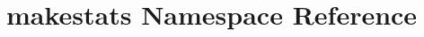 \hypertarget{namespacemakestats}{\section{makestats Namespace Reference}
\label{namespacemakestats}
}
